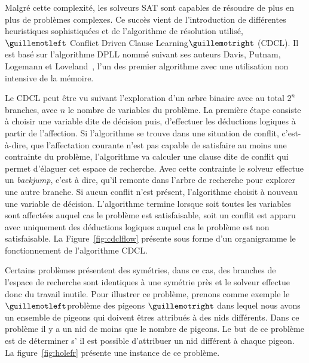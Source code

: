 Malgré cette complexité, les solveurs SAT sont capables de résoudre de plus en plus de problèmes complexes.
Ce succès vient de l'introduction de différentes heuristiques sophistiquées et de 
l'algorithme de résolution utilisé, $\guillemotleft$ Conflict Driven Clause Learning$\guillemotright$ (CDCL).
Il est basé sur l'algorithme DPLL nommé suivant ses auteurs Davis, Putnam, Logemann et Loveland~\cite{dpll_62},
l'un des premier algorithme avec une utilisation non intensive de la mémoire.

%
%
%

Le CDCL peut être vu suivant l'exploration d'un arbre binaire avec au total $2^n$ branches, avec $n$ le nombre de variables du problème.
La première étape consiste à choisir une variable dite de décision puis, d'effectuer les déductions logiques à partir de l'affection. 
Si l'algorithme se trouve dans une situation de conflit, c'est-à-dire, que l'affectation courante n'est pas capable de satisfaire au moins une contrainte du problème, l'algorithme va calculer une clause dite de conflit qui permet d'élaguer 
cet espace de recherche. Avec cette contrainte le solveur effectue un \textit{backjump}, c'est à dire, qu'il remonte dans l'arbre
de recherche pour explorer une autre branche.
Si aucun conflit n'est présent, l'algorithme choisit à nouveau une variable de décision. L'algorithme termine lorsque soit toutes les variables sont affectées auquel cas le problème est satisfaisable, soit un conflit est apparu avec uniquement des déductions logiques auquel cas le
problème est non satisfaisable.
La Figure~\ref{fig:cdclflow} présente sous forme d'un organigramme le fonctionnement de l'algorithme CDCL.



Certains problèmes présentent des symétries, dans ce cas, des branches de l'espace de recherche 
sont identiques à une symétrie près et le solveur effectue donc du travail inutile.
Pour illustrer ce problème, prenons comme exemple le $\guillemotleft$problème des pigeons $\guillemotright$ dans lequel nous avons un ensemble de pigeons qui doivent êtres attribués à des nids différents. Dans ce problème il y a un nid de moins que le nombre de pigeons.
Le but de ce problème est de déterminer s’ il est possible d'attribuer un nid différent à chaque pigeon.
La figure~\ref{fig:holefr} présente une instance de ce problème.


